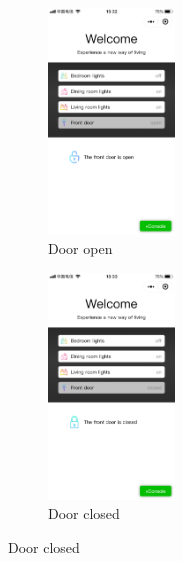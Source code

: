 \documentclass[12pt,a4paper]{report}
\begin{document}
\begin{figure}[H]
	\begin{subfigure}{.5\textwidth}
		\centering
		\includegraphics[height=6cm, width=.5\linewidth]{figures/4.png}
		\caption{Door open}
	\end{subfigure}
	\begin{subfigure}{.5\textwidth}
		\centering
		\includegraphics[height=6cm, width=.5\linewidth]{figures/5.png}
		\caption{Door closed}
	\end{subfigure}
\end{figure}
\end{document}

